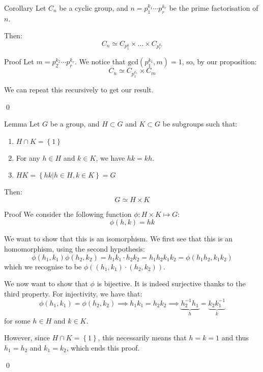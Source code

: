 \documentclass[a4paper]{article}
\begin{document}
\begin{parag}{Corollary}
    Let $C_n$ be a cyclic group, and $n = p_1^{k_1} \cdots p_r^{k_r}$ be the prime factorisation of $n$.

    Then: 
    \[C_n \simeq C_{p_1^k} \times \ldots \times C_{p_r^{k_r}}\]
    
    \begin{subparag}{Proof}
        Let $m = p_2^{k_2} \cdots p_r^{k_r}$. We notice that $\text{gcd}\left(p_1^{k_1}, m\right) = 1$, so, by our proposition: 
        \[C_n \simeq C_{p_1^{k_1}} \times C_m\]
        
        We can repeat this recursively to get our result.

        \qed
    \end{subparag}
\end{parag}

\begin{parag}{Lemma}
    Let $G$ be a group, and $H\subset G$ and $K \subset G$ be subgroups such that:
    \begin{enumerate}
        \item $H \cap K = \left\{1\right\}$
        \item For any $h \in H$ and $k \in K$, we have $hk = kh$.
        \item $HK = \left\{hk | h \in H, k \in K\right\} = G$
    \end{enumerate}
    
    Then: 
    \[G \simeq H \times K\]

    \begin{subparag}{Proof}
        We consider the following function $\phi: H \times K \mapsto G$: 
        \[\phi\left(h, k\right) = hk\]
        
        We want to show that this is an isomorphism. We first see that this is an homomorphism, using the second hypothesis:
        \[\phi\left(h_1, k_1\right)\phi\left(h_2, k_2\right) = h_1 k_1 \cdot  h_2 k_2 = h_1 h_2 k_1 k_2 = \phi\left(h_1 h_2, k_1 k_2\right)\]
        which we recognise to be $\phi\left(\left(h_1, k_1\right)\cdot \left(h_2, k_2\right)\right)$.
        
        We now want to show that $\phi$ is bijective. It is indeed surjective thanks to the third property. For injectivity, we have that: 
        \[\phi\left(h_1, k_1\right) = \phi\left(h_2, k_2\right) \implies h_1 k_1 = h_2 k_2 \implies \underbrace{h_2^{-1} h_1}_{h} = \underbrace{k_2 k_1^{-1}}_{k}\]
        for some $h \in H$ and $k \in K$.

        However, since $H \cap K = \left\{1\right\}$, this necessarily means that $h = k = 1$ and thus $h_1 = h_2$ and $k_1 = k_2$, which ends this proof.

        \qed
    \end{subparag}
\end{parag}
\end{document}
